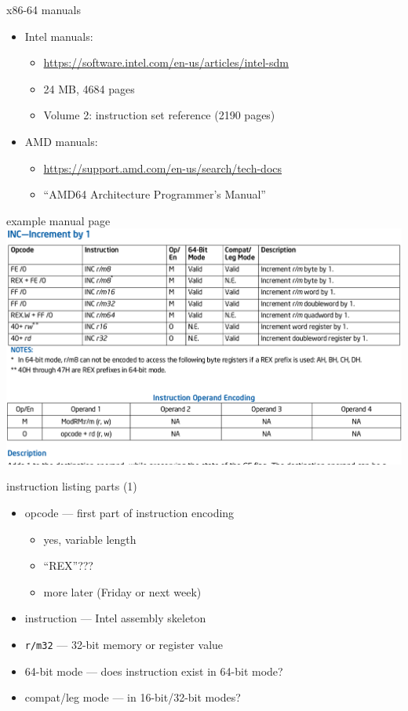 \begin{frame}{x86-64 manuals}
\begin{itemize}
\item Intel manuals:
    \begin{itemize}
    \item \small \url{https://software.intel.com/en-us/articles/intel-sdm}
    \item 24 MB, 4684 pages
    \item Volume 2: instruction set reference (2190 pages)
    \end{itemize}
\item AMD manuals:
    \begin{itemize}
    \item \small \url{https://support.amd.com/en-us/search/tech-docs}
    \item ``AMD64 Architecture Programmer's Manual''
    \end{itemize}
\end{itemize}
\end{frame}

\begin{frame}{example manual page}
\includegraphics[width=\textwidth]{../asm/example-manual}
\end{frame}

\begin{frame}{instruction listing parts (1)}
    \begin{itemize}
    \item opcode --- first part of instruction encoding
        \begin{itemize}
        \item yes, variable length
        \item ``REX''???
        \item more later (Friday or next week)
        \end{itemize}
    \item instruction --- Intel assembly skeleton
    \item {\tt r/m32} --- 32-bit memory or register value
    \item 64-bit mode --- does instruction exist in 64-bit mode?
    \item compat/leg mode --- in 16-bit/32-bit modes?
    \end{itemize}
\end{frame}

